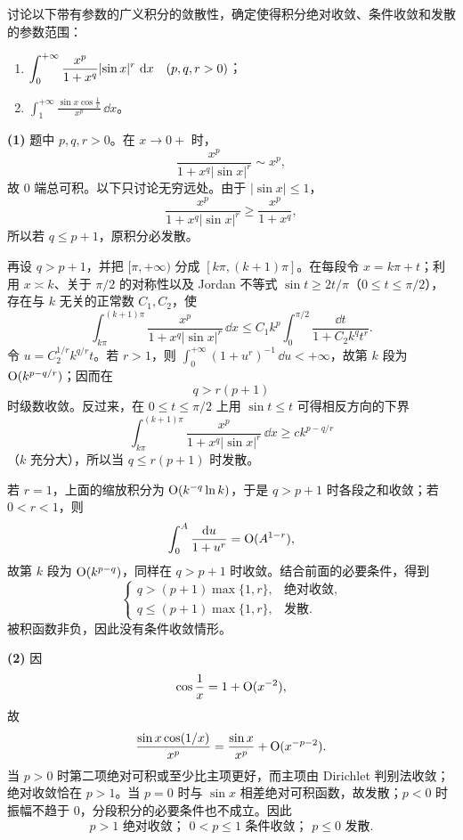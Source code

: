 \begin{xreferenceproblem}[9]
讨论以下带有参数的广义积分的敛散性，确定使得积分绝对收敛、条件收敛和发散的参数范围：
  \begin{enumerate}[label=(\arabic*)]
    \item $\displaystyle\int_0^{+\infty}\frac{x^p}{1+x^q}\lvert\sin x\rvert^r\,\mathop{}\!\mathrm{d} x\quad(p,q,r>0)$；
    \item $\displaystyle\int_1^{+\infty}\frac{\sin x\cos\frac1x}{x^p}\,\dd x$。
  \end{enumerate}
\end{xreferenceproblem}
\begin{xsolution}
\textbf{(1)} 题中 $p,q,r>0$。在 $x\to0+$ 时，
\[
  \frac{x^p}{1+x^q|\sin x|^r}\sim x^p,
\]
故 $0$ 端总可积。以下只讨论无穷远处。由于 $|\sin x|\leq1$，
\[
  \frac{x^p}{1+x^q|\sin x|^r}\geq\frac{x^p}{1+x^q},
\]
所以若 $q\leq p+1$，原积分必发散。

再设 $q>p+1$，并把 $[\pi,+\infty)$ 分成 $[k\pi,(k+1)\pi]$。在每段令 $x=k\pi+t$；利用 $x\asymp k$、关于 $\pi/2$ 的对称性以及 Jordan 不等式 $\sin t\geq2t/\pi$（$0\leq t\leq\pi/2$），存在与 $k$ 无关的正常数 $C_1,C_2$，使
\[
  \int_{k\pi}^{(k+1)\pi}\frac{x^p}{1+x^q|\sin x|^r}\,\dd x
  \leq C_1 k^p\int_0^{\pi/2}\frac{\dd t}{1+C_2k^q t^r}.
\]
令 $u=C_2^{1/r}k^{q/r}t$。若 $r>1$，则 $\int_0^{+\infty}(1+u^r)^{-1}\,\dd u<+\infty$，故第 $k$ 段为 $\mathrm{O}(k^{p-q/r})$；因而在
\[
  q>r(p+1)
\]
时级数收敛。反过来，在 $0\leq t\leq\pi/2$ 上用 $\sin t\leq t$ 可得相反方向的下界
\[
  \int_{k\pi}^{(k+1)\pi}\frac{x^p}{1+x^q|\sin x|^r}\,\dd x
  \geq c k^{p-q/r}
\]
（$k$ 充分大），所以当 $q\leq r(p+1)$ 时发散。

若 $r=1$，上面的缩放积分为 $\mathrm{O}(k^{-q}\ln k)$，于是 $q>p+1$ 时各段之和收敛；若 $0<r<1$，则
\[
  \int_0^A\frac{\mathop{}\!\mathrm{d} u}{1+u^r}=\mathrm{O}(A^{1-r}),
\]
故第 $k$ 段为 $\mathrm{O}(k^{p-q})$，同样在 $q>p+1$ 时收敛。结合前面的必要条件，得到
\[
  \boxed{
  \begin{cases}
    q>(p+1)\max\{1,r\},&\text{绝对收敛},\\
    q\leq(p+1)\max\{1,r\},&\text{发散}.
  \end{cases}}
\]
被积函数非负，因此没有条件收敛情形。

\textbf{(2)} 因
\[
  \cos\frac1x=1+\mathrm{O}(x^{-2}),
\]
故
\[
  \frac{\sin x\cos(1/x)}{x^p}
  =\frac{\sin x}{x^p}+\mathrm{O}(x^{-p-2}).
\]
当 $p>0$ 时第二项绝对可积或至少比主项更好，而主项由 Dirichlet 判别法收敛；绝对收敛恰在 $p>1$。当 $p=0$ 时与 $\sin x$ 相差绝对可积函数，故发散；$p<0$ 时振幅不趋于 $0$，分段积分的必要条件也不成立。因此
\[
  \boxed{p>1\text{ 绝对收敛； }0<p\leq1\text{ 条件收敛； }p\leq0\text{ 发散}.}
\]
\end{xsolution}



